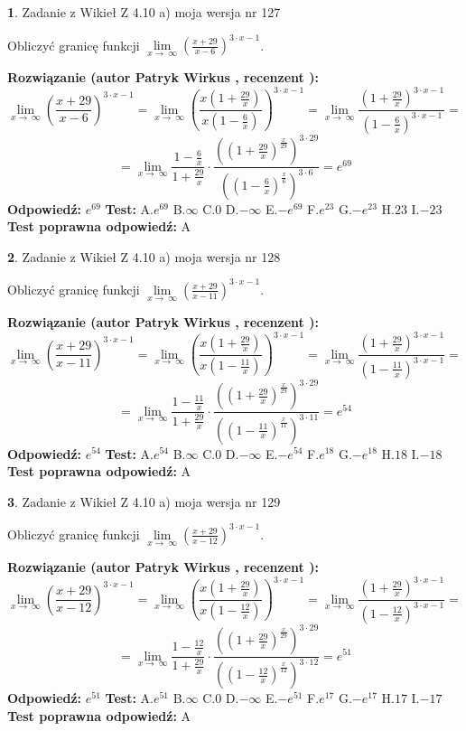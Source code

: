 \documentclass[12pt, a4paper]{article}
\theoremstyle{definition} %
\newtheorem{zad}{}
\newcommand{\zadStart}[1]{\begin{zad}#1\newline}
\newcommand{\zadStop}{\end{zad}}
\newcommand{\rozwStart}[2]{\noindent \textbf{Rozwiązanie (autor #1 , recenzent #2): }\newline}
\newcommand{\rozwStop}{\newline}
\newcommand{\odpStart}{\noindent \textbf{Odpowiedź:}\newline}
\newcommand{\odpStop}{\newline}
\newcommand{\testStart}{\noindent \textbf{Test:}\newline}
\newcommand{\testStop}{\newline}
\newcommand{\kluczStart}{\noindent \textbf{Test poprawna odpowiedź:}\newline}
\newcommand{\kluczStop}{\newline}
\begin{document}
\zadStart{Zadanie z Wikieł Z 4.10 a) moja wersja nr 127}

Obliczyć granicę funkcji  $\lim\limits_{x\to\ \infty}(\frac{x+29}{x-6})^{3\cdot x-1}$.
\zadStop
\rozwStart{Patryk Wirkus}{}
$$\lim\limits_{x\to\ \infty}(\frac{x+29}{x-6})^{3\cdot x-1} = \lim\limits_{x\to\ \infty}(\frac{x(1+\frac{29}{x})}{x(1-\frac{6}{x})})^{3\cdot x-1}=\lim\limits_{x\to\ \infty}\frac{(1+\frac{29}{x})^{3\cdot x-1}}{(1-\frac{6}{x})^{3\cdot x-1}}=$$
$$=\lim\limits_{x\to\ \infty}\frac{1-\frac{6}{x}}{1+\frac{29}{x}}\cdot\frac{((1+\frac{29}{x})^{\frac{x}{29}})^{3\cdot29}}{((1-\frac{6}{x})^{\frac{x}{6}})^{3\cdot6}}=e^{69}$$
\rozwStop
\odpStart
$e^{69}$
\odpStop
\testStart
A.$e^{69}$ B.$\infty$ C.$0$ D.$-\infty$ E.$-e^{69}$
F.$e^{23}$ G.$-e^{23}$
H.$23$
I.$-23$
\testStop
\kluczStart
A
\kluczStop



\zadStart{Zadanie z Wikieł Z 4.10 a) moja wersja nr 128}

Obliczyć granicę funkcji  $\lim\limits_{x\to\ \infty}(\frac{x+29}{x-11})^{3\cdot x-1}$.
\zadStop
\rozwStart{Patryk Wirkus}{}
$$\lim\limits_{x\to\ \infty}(\frac{x+29}{x-11})^{3\cdot x-1} = \lim\limits_{x\to\ \infty}(\frac{x(1+\frac{29}{x})}{x(1-\frac{11}{x})})^{3\cdot x-1}=\lim\limits_{x\to\ \infty}\frac{(1+\frac{29}{x})^{3\cdot x-1}}{(1-\frac{11}{x})^{3\cdot x-1}}=$$
$$=\lim\limits_{x\to\ \infty}\frac{1-\frac{11}{x}}{1+\frac{29}{x}}\cdot\frac{((1+\frac{29}{x})^{\frac{x}{29}})^{3\cdot29}}{((1-\frac{11}{x})^{\frac{x}{11}})^{3\cdot11}}=e^{54}$$
\rozwStop
\odpStart
$e^{54}$
\odpStop
\testStart
A.$e^{54}$ B.$\infty$ C.$0$ D.$-\infty$ E.$-e^{54}$
F.$e^{18}$ G.$-e^{18}$
H.$18$
I.$-18$
\testStop
\kluczStart
A
\kluczStop



\zadStart{Zadanie z Wikieł Z 4.10 a) moja wersja nr 129}

Obliczyć granicę funkcji  $\lim\limits_{x\to\ \infty}(\frac{x+29}{x-12})^{3\cdot x-1}$.
\zadStop
\rozwStart{Patryk Wirkus}{}
$$\lim\limits_{x\to\ \infty}(\frac{x+29}{x-12})^{3\cdot x-1} = \lim\limits_{x\to\ \infty}(\frac{x(1+\frac{29}{x})}{x(1-\frac{12}{x})})^{3\cdot x-1}=\lim\limits_{x\to\ \infty}\frac{(1+\frac{29}{x})^{3\cdot x-1}}{(1-\frac{12}{x})^{3\cdot x-1}}=$$
$$=\lim\limits_{x\to\ \infty}\frac{1-\frac{12}{x}}{1+\frac{29}{x}}\cdot\frac{((1+\frac{29}{x})^{\frac{x}{29}})^{3\cdot29}}{((1-\frac{12}{x})^{\frac{x}{12}})^{3\cdot12}}=e^{51}$$
\rozwStop
\odpStart
$e^{51}$
\odpStop
\testStart
A.$e^{51}$ B.$\infty$ C.$0$ D.$-\infty$ E.$-e^{51}$
F.$e^{17}$ G.$-e^{17}$
H.$17$
I.$-17$
\testStop
\kluczStart
A
\kluczStop
\end{document}
